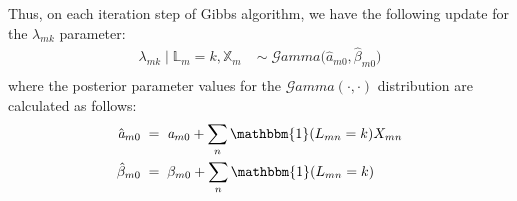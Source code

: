 Thus, on each iteration step of Gibbs algorithm, we have the following update for the $\lambda_{mk}$ parameter:
\begin{equation}
  \begin{aligned}
  	\lambda_{mk} \mid \mathbb{L}_{m}=k, \mathbb{X}_{m} \;& \sim \;\mathcal{G}amma\big(\hat{\mathit{a}}_{m0}, \hat{\beta}_{m0}\big) \\
  \end{aligned}
\end{equation}
where the posterior parameter values for the $\mathcal{G}amma(\cdot,\cdot)$ distribution are calculated as follows:
\begin{equation}
  \begin{aligned}
  	\hat{\mathit{a}}_{m0} \; &= \; \mathit{a}_{m0} + \sum_{n}\mathbbm{1}(L_{mn}=k)X_{mn} \\
  	\hat{\beta}_{m0} \; &= \; \beta_{m0} +  \sum_{n}\mathbbm{1}(L_{mn}=k)
  \end{aligned}
\end{equation}
